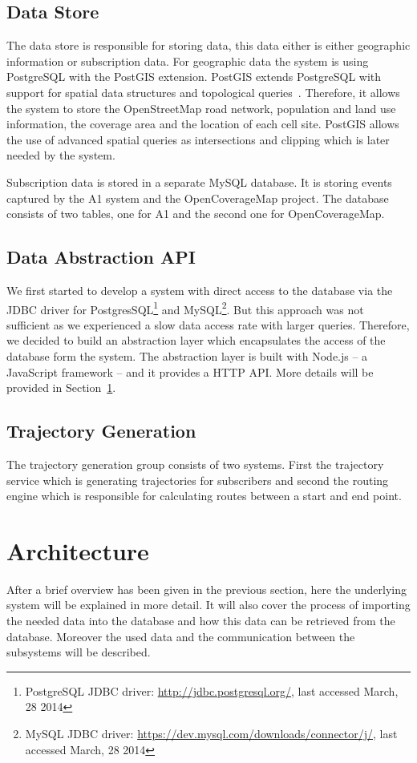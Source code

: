 \subsection{Data Store}
The data store is responsible for storing data, this data either is either geographic information or subscription data. For geographic data the system is using PostgreSQL with the PostGIS extension. PostGIS extends PostgreSQL with support for spatial data structures and topological queries~\cite{Obe2011}. Therefore, it allows the system to store the OpenStreetMap road network, population and land use information, the coverage area and the location of each cell site. PostGIS allows the use of advanced spatial queries as intersections and clipping which is later needed by the system.

Subscription data is stored in a separate MySQL database. It is storing events captured by the A1 system and the OpenCoverageMap project. The database consists of two tables, one for A1 and the second one for OpenCoverageMap.
\subsection{Data Abstraction API}
We first started to develop a system with direct access to the database via the JDBC driver for PostgresSQL\footnote{PostgreSQL JDBC driver: \url{http://jdbc.postgresql.org/}, last accessed March, 28 2014} and MySQL\footnote{MySQL JDBC driver: \url{https://dev.mysql.com/downloads/connector/j/}, last accessed March, 28 2014}. But this approach was not sufficient as we experienced a slow data access rate with larger queries. Therefore, we decided to build an abstraction layer which encapsulates the access of the database form the system. The abstraction layer is built with Node.js -- a JavaScript framework -- and it provides a HTTP API. More details will be provided in Section~\ref{sec:architecture}.
\subsection{Trajectory Generation}
The trajectory generation group consists of two systems. First the trajectory service which is generating trajectories for subscribers and second the routing engine which is responsible for calculating routes between a start and end point.
\section{Architecture}
\label{sec:architecture}
After a brief overview has been given in the previous section, here the underlying system will be explained in more detail. It will also cover the process of importing the needed data into the database and how this data can be retrieved from the database. Moreover the used data and the communication between the subsystems will be described.
